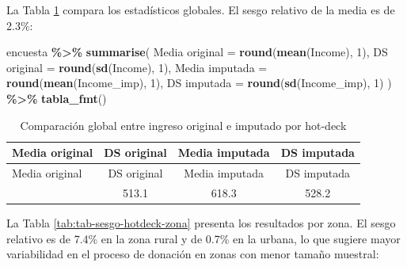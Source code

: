 \documentclass[
  spanish,
  12pt,
]{book}
\newenvironment{Shaded}{\begin{snugshade}}{\end{snugshade}}
\newcommand{\AttributeTok}[1]{\textcolor[rgb]{0.13,0.29,0.53}{#1}}
\newcommand{\DecValTok}[1]{\textcolor[rgb]{0.00,0.00,0.81}{#1}}
\newcommand{\FunctionTok}[1]{\textcolor[rgb]{0.13,0.29,0.53}{\textbf{#1}}}
\newcommand{\NormalTok}[1]{#1}
\newcommand{\OtherTok}[1]{\textcolor[rgb]{0.56,0.35,0.01}{#1}}
\newcommand{\SpecialCharTok}[1]{\textcolor[rgb]{0.81,0.36,0.00}{\textbf{#1}}}
\newcommand{\StringTok}[1]{\textcolor[rgb]{0.31,0.60,0.02}{#1}}
\begin{document}
La Tabla \ref{tab:tab-sesgo-hotdeck-global} compara los estadísticos globales. El sesgo relativo de la media es de 2.3\%:

\begin{Shaded}
\begin{Highlighting}[]
\NormalTok{encuesta }\SpecialCharTok{\%\textgreater{}\%}
  \FunctionTok{summarise}\NormalTok{(}
    \StringTok{\textasciigrave{}}\AttributeTok{Media original}\StringTok{\textasciigrave{}}  \OtherTok{=} \FunctionTok{round}\NormalTok{(}\FunctionTok{mean}\NormalTok{(Income), }\DecValTok{1}\NormalTok{),}
    \StringTok{\textasciigrave{}}\AttributeTok{DS original}\StringTok{\textasciigrave{}}     \OtherTok{=} \FunctionTok{round}\NormalTok{(}\FunctionTok{sd}\NormalTok{(Income), }\DecValTok{1}\NormalTok{),}
    \StringTok{\textasciigrave{}}\AttributeTok{Media imputada}\StringTok{\textasciigrave{}}  \OtherTok{=} \FunctionTok{round}\NormalTok{(}\FunctionTok{mean}\NormalTok{(Income\_imp), }\DecValTok{1}\NormalTok{),}
    \StringTok{\textasciigrave{}}\AttributeTok{DS imputada}\StringTok{\textasciigrave{}}     \OtherTok{=} \FunctionTok{round}\NormalTok{(}\FunctionTok{sd}\NormalTok{(Income\_imp), }\DecValTok{1}\NormalTok{)}
\NormalTok{  ) }\SpecialCharTok{\%\textgreater{}\%} \FunctionTok{tabla\_fmt}\NormalTok{()}
\end{Highlighting}
\end{Shaded}

\begin{longtable}[]{@{}lccc@{}}
\caption{\label{tab:tab-sesgo-hotdeck-global}Comparación global entre ingreso original e imputado por hot-deck}\tabularnewline
\toprule\noalign{}
Media original & DS original & Media imputada & DS imputada \\
\midrule\noalign{}
\endfirsthead
\toprule\noalign{}
Media original & DS original & Media imputada & DS imputada \\
\midrule\noalign{}
\endhead
\bottomrule\noalign{}
\endlastfoot
604.2 & 513.1 & 618.3 & 528.2 \\
\end{longtable}

La Tabla \ref{tab:tab-sesgo-hotdeck-zona} presenta los resultados por zona. El sesgo relativo es de 7.4\% en la zona rural y de 0.7\% en la urbana, lo que sugiere mayor variabilidad en el proceso de donación en zonas con menor tamaño muestral:
\end{document}
